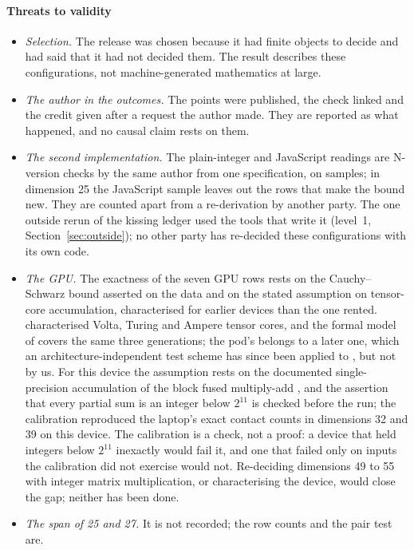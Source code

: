 \documentclass[preprint,11pt,authoryear,a4paper]{elsarticle}
\begin{document}
\paragraph{Threats to validity}\label{sec:threats}
\begin{itemize}
\item \emph{Selection.} The release was chosen because it had finite objects to decide and had said that it had not decided them. The result describes these \MtKwRows{} configurations, not machine-generated mathematics at large.
\item \emph{The author in the outcomes.} The points were published, the check linked and the credit given after a request the author made. They are reported as what happened, and no causal claim rests on them.
\item \emph{The second implementation.} The plain-integer and JavaScript readings are N-version checks by the same author from one specification, on samples; in dimension 25 the JavaScript sample leaves out the rows that make the bound new. They are counted apart from a re-derivation by another party. The one outside rerun of the kissing ledger used the tools that write it (level~1, Section~\ref{sec:outside}); no other party has re-decided these configurations with its own code.
\item \emph{The GPU.} The exactness of the seven GPU rows rests on the Cauchy--Schwarz bound asserted on the data and on the stated assumption on tensor-core accumulation, characterised for earlier devices than the one rented. \citet{Fasi21} characterised Volta, Turing and Ampere tensor cores, and the formal model of \citet{Valpey25} covers the same three generations; the pod's \MtKwGpuName{} belongs to a later one, which an architecture-independent test scheme has since been applied to \citep{KhattakMikaitis25}, but not by us. For this device the assumption rests on the documented single-precision accumulation of the block fused multiply-add \citep{Blanchard20,HighamMary22}, and the assertion that every partial sum is an integer below $2^{11}$ is checked before the run; the calibration reproduced the laptop's exact contact counts in dimensions 32 and 39 on this device. The calibration is a check, not a proof: a device that held integers below $2^{11}$ inexactly would fail it, and one that failed only on inputs the calibration did not exercise would not. Re-deciding dimensions 49 to 55 with integer matrix multiplication, or characterising the device, would close the gap; neither has been done.
\item \emph{The span of 25 and 27.} It is not recorded; the row counts and the pair test are.
\end{itemize}
\end{document}
